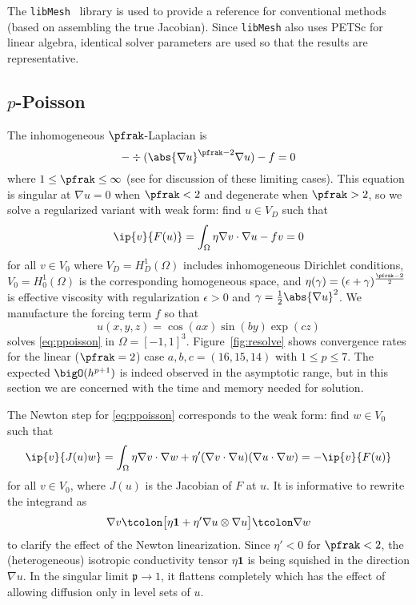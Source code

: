 The \texttt{libMesh}~\citep{libmesh} library is used to provide a reference for conventional methods (based on assembling
the true Jacobian).  Since \texttt{libMesh} also uses PETSc for linear algebra, identical solver parameters are used so
that the results are representative.

\subsection{$p$-Poisson}\label{sec:ppoisson}
The inhomogeneous $\pfrak$-Laplacian is
\begin{equation*}
  -\div (\abs{\nabla u}^{\pfrak-2} \nabla u) - f = 0
\end{equation*}
where $1 \le \pfrak \le \infty$ (see \citet{evans2007lol} for discussion of these limiting cases).  This equation is
singular at $\nabla u = 0$ when $\pfrak<2$ and degenerate when $\pfrak>2$, so we solve a regularized variant with weak
form: find $u \in V_D$ such that
\begin{equation}\label{eq:ppoisson}
  \ip{v}{F(u)} = \int_\Omega \eta \nabla v \cdot \nabla u - f v = 0
\end{equation}
for all $v \in V_0$ where $V_D = H^1_D(\Omega)$ includes inhomogeneous Dirichlet conditions, $V_0 = H^1_0(\Omega)$ is
the corresponding homogeneous space, and $\eta(\gamma) = ( \epsilon + \gamma )^{\frac{\pfrak-2}{2}}$ is effective
viscosity with regularization $\epsilon > 0$ and $\gamma = \frac 1 2 \abs{\nabla u}^2 $.  We manufacture the forcing
term $f$ so that
\[ u(x,y,z) = \cos(ax) \sin(by) \exp(cz) \] solves \eqref{eq:ppoisson} in $\Omega = [-1,1]^3$.  Figure~\ref{fig:resolve}
shows convergence rates for the linear ($\pfrak = 2$) case $a,b,c=(16,15,14)$ with $1 \le p \le 7$.  The expected
$\bigO(h^{p+1})$ is indeed observed in the asymptotic range, but in this section we are concerned with the time and
memory needed for solution.

The Newton step for \eqref{eq:ppoisson} corresponds to the weak form: find $w \in V_0$ such that
\begin{equation*}
  \ip{v}{J(u) w} = \int_\Omega \eta \nabla v \cdot\nabla w + \eta' (\nabla v\cdot\nabla u)(\nabla u\cdot\nabla w) = - \ip{v}{F(u)}
\end{equation*}
for all $v \in V_0$, where $J(u)$ is the Jacobian of $F$ at $u$.  It is informative to rewrite the integrand as
\begin{equation*}
  \nabla v \tcolon \big[\eta\bm 1 + \eta' \nabla u \otimes \nabla u\big] \tcolon \nabla w
\end{equation*}
to clarify the effect of the Newton linearization.  Since $\eta' < 0$ for $\pfrak < 2$, the (heterogeneous) isotropic
conductivity tensor $\eta\bm 1$ is being squished in the direction $\nabla u$.  In the singular limit $\mathfrak p \to
1$, it flattens completely which has the effect of allowing diffusion only in level sets of $u$.

